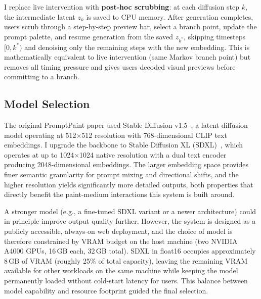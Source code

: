 \documentclass[sigconf]{acmart}
\begin{document}
I replace live intervention with \textbf{post-hoc scrubbing}: at each
diffusion step $k$, the intermediate latent $z_k$ is saved to CPU memory.
After generation completes, users scrub through a step-by-step preview bar,
select a branch point, update the prompt palette, and resume generation from
the saved $z_{k^*}$, skipping timesteps $[0, k^*)$ and denoising only the
remaining steps with the new embedding. This is mathematically equivalent to
live intervention (same Markov branch point) but removes all timing pressure
and gives users decoded visual previews before committing to a branch.

\subsection{Model Selection}

The original PromptPaint paper used Stable Diffusion v1.5~\cite{rombach2022high},
a latent diffusion model operating at 512$\times$512 resolution with 768-dimensional
CLIP text embeddings. I upgrade the backbone to Stable Diffusion XL
(SDXL)~\cite{podell2023sdxl}, which operates at up to 1024$\times$1024 native
resolution with a dual text encoder producing 2048-dimensional embeddings.
The larger embedding space provides finer semantic granularity for prompt mixing
and directional shifts, and the higher resolution yields significantly more
detailed outputs, both properties that directly benefit the paint-medium
interactions this system is built around.

A stronger model (e.g., a fine-tuned SDXL variant or a newer architecture)
could in principle improve output quality further. However, the system is
designed as a publicly accessible, always-on web deployment, and the choice
of model is therefore constrained by VRAM budget on the host machine (two
NVIDIA A4000 GPUs, 16\,GB each, 32\,GB total). SDXL in float16 occupies
approximately 8\,GB of VRAM (roughly 25\% of total capacity), leaving
the remaining VRAM available for other workloads on the same machine while
keeping the model permanently loaded without cold-start latency for users.
This balance between model capability and resource footprint guided the
final selection.
\end{document}
